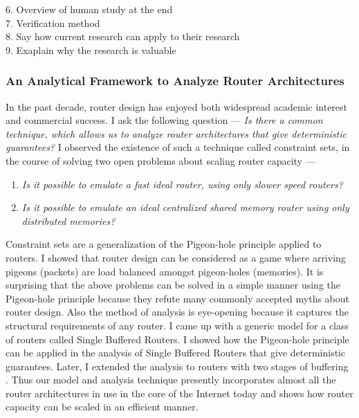 \documentclass[a4paper, 10pt]{article}
\begin{document}
\begin{small}
6. Overview of human study at the end \\

7. Verification method \\

8. Say how current research can apply to their research \\

9. Exaplain why the research is valuable \\


\subsubsection*{\small An Analytical Framework to Analyze Router Architectures}

In the past decade, router design has enjoyed both widespread academic interest and
commercial success. I ask the following question --- {\em Is there a common
technique, which allows us to analyze router architectures that give deterministic 
guarantees?}
I observed the existence of such a technique called constraint sets, in the course of solving 
two open problems about scaling router capacity ---

\begin{enumerate}

\item {\em Is it possible to emulate a fast ideal router, using only slower speed routers?}

\item {\em Is it possible to emulate an ideal centralized shared memory router using only distributed memories?}

\end{enumerate}

Constraint sets are a generalization of the Pigeon-hole principle applied to
routers. I showed that router design can be considered as a game where arriving
pigeons (packets) are load balanced amongst pigeon-holes (memories). 
It is surprising that the above problems can be solved \cite{pps, ppsmcast, dsm} in a simple
manner using the Pigeon-hole principle because they refute many commonly 
accepted myths about router design. 
Also the method of analysis is eye-opening because it captures the structural 
requirements of any router. 
I came up with a generic model for a class of routers called Single Buffered Routers. 
I showed how the Pigeon-hole principle can be applied in the analysis of Single Buffered
Routers that give deterministic guarantees.  Later, I extended the analysis to 
routers with two stages of buffering \cite{csets}. 
Thus our model and analysis technique
presently incorporates almost all the router architectures in use in the
core of the Internet today and shows how router capacity can be scaled in
an efficient manner.


\end{small}
\end{document}

